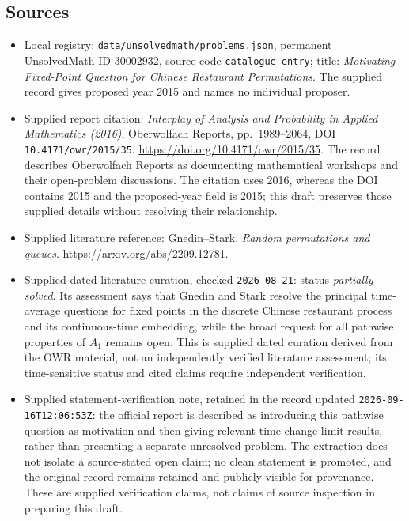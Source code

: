 \documentclass[11pt]{article}
\begin{document}
\subsection{Sources}
\begin{itemize}
\item Local registry: \texttt{data/unsolvedmath/problems.json}, permanent UnsolvedMath ID \(30002932\), source code \texttt{catalogue entry}; title: \emph{Motivating Fixed-Point Question for Chinese Restaurant Permutations}. The supplied record gives proposed year 2015 and names no individual proposer.
\item Supplied report citation: \emph{Interplay of Analysis and Probability in Applied Mathematics (2016)}, Oberwolfach Reports, pp.\ 1989--2064, DOI \texttt{10.4171/owr/2015/35}. \url{https://doi.org/10.4171/owr/2015/35}. The record describes Oberwolfach Reports as documenting mathematical workshops and their open-problem discussions. The citation uses 2016, whereas the DOI contains 2015 and the proposed-year field is 2015; this draft preserves those supplied details without resolving their relationship.
\item Supplied literature reference: Gnedin--Stark, \emph{Random permutations and queues}. \url{https://arxiv.org/abs/2209.12781}.
\item Supplied dated literature curation, checked \texttt{2026-08-21}: status \emph{partially solved}. Its assessment says that Gnedin and Stark resolve the principal time-average questions for fixed points in the discrete Chinese restaurant process and its continuous-time embedding, while the broad request for all pathwise properties of \(A_1\) remains open. This is supplied dated curation derived from the OWR material, not an independently verified literature assessment; its time-sensitive status and cited claims require independent verification.
\item Supplied statement-verification note, retained in the record updated \texttt{2026-09-16T12:06:53Z}: the official report is described as introducing this pathwise question as motivation and then giving relevant time-change limit results, rather than presenting a separate unresolved problem. The extraction does not isolate a source-stated open claim; no clean statement is promoted, and the original record remains retained and publicly visible for provenance. These are supplied verification claims, not claims of source inspection in preparing this draft.
\end{itemize}
\end{document}
